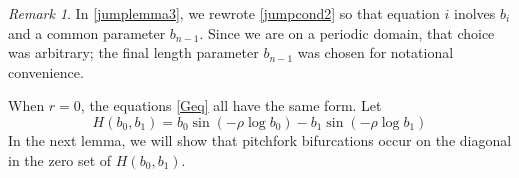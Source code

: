 \documentclass[10pt,reqno]{amsart}
\theoremstyle{plain}
\theoremstyle{definition}
\theoremstyle{remark}
\newtheorem{remark}[theorem]{Remark}
\numberwithin{theorem}{section}
\numberwithin{equation}{section}
\begin{document}
\begin{remark}
In \cref{jumplemma3}, we rewrote \cref{jumpcond2} so that equation $i$ inolves $b_i$ and a common parameter $b_{n-1}$. Since we are on a periodic domain, that choice was arbitrary;  the final length parameter $b_{n-1}$ was chosen for notational convenience.
\end{remark}

When $r = 0$, the equations \eqref{Geq} all have the same form. Let
\begin{equation}\label{defH}
H(b_0, b_1) = b_0 \sin \left( -\rho \log b_0 \right) - b_1 \sin \left( -\rho \log b_1 \right)
\end{equation}
In the next lemma, we will show that pitchfork bifurcations occur on the diagonal in the zero set of $H(b_0, b_1)$.

\end{document}
